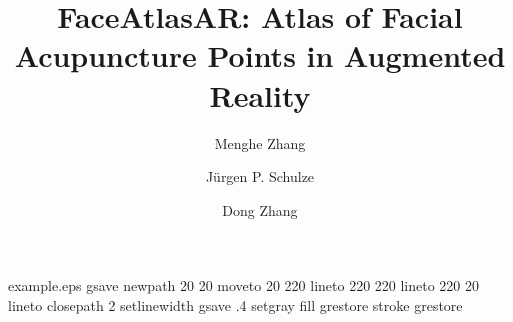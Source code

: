 %
%
%
%
%
\begin{filecontents*}{example.eps}
gsave
newpath
  20 20 moveto
  20 220 lineto
  220 220 lineto
  220 20 lineto
closepath
2 setlinewidth
gsave
  .4 setgray fill
grestore
stroke
grestore
\end{filecontents*}
%
\RequirePackage{fix-cm}
%
\documentclass[twocolumn]{svjour3}          %
%
\smartqed  %
%
\usepackage{graphicx}
%
\usepackage{mathptmx}      %
\usepackage{subcaption}
\captionsetup{compatibility=false}
\usepackage{xcolor}
\usepackage{listings}

\usepackage{xparse}


%
%
%
%


\title{FaceAtlasAR: Atlas of Facial Acupuncture Points in Augmented Reality}


\author{Menghe Zhang \and J\"urgen P. Schulze \and Dong Zhang}

